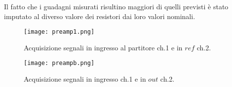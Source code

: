 	Il fatto che i guadagni misurati risultino maggiori di quelli previsti è stato imputato al 
	diverso valore dei resistori dai loro valori nominali.
	
		\begin{figure}[h]
		\begin{minipage}{0.45\textwidth}
			\centering
			\texttt{[image: preamp1.png]}
			\caption{Acquisizione segnali in ingresso al partitore ch.1 e in $ref$ ch.2.}
			\label{fig:preamp1}
		\end{minipage}
		\begin{minipage}{0.45\textwidth}
			\centering
			\texttt{[image: preampb.png]}
			\caption{Acquisizione segnali in ingresso ch.1 e in $out$ ch.2.}
			\label{fig:preamp2}
		\end{minipage}
	\end{figure}
	
	